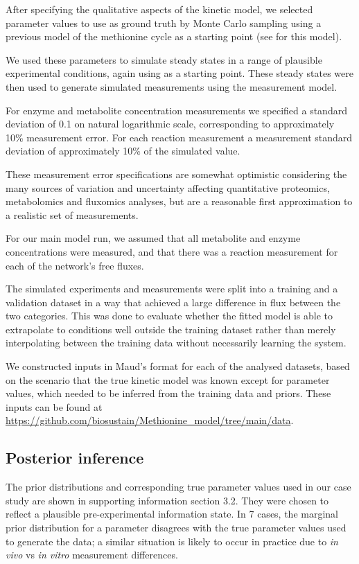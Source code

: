 \documentclass[journal=asbcd6,manuscript=article,layout=traditional]{achemso}
\begin{document}
After specifying the qualitative aspects of the kinetic model, we
selected parameter values to use as ground truth by Monte Carlo sampling
using a previous model of the methionine cycle as a starting point (see
\citet{saa_construction_2016} for this model).

We used these parameters to simulate steady states in a range of
plausible experimental conditions, again using
\citet{saa_construction_2016} as a starting point. These steady states
were then used to generate simulated measurements using the measurement
model.

For enzyme and metabolite concentration measurements we specified a
standard deviation of 0.1 on natural logarithmic scale, corresponding to
approximately 10\% measurement error. For each reaction measurement a
measurement standard deviation of approximately 10\% of the simulated
value.

These measurement error specifications are somewhat optimistic
considering the many sources of variation and uncertainty affecting
quantitative proteomics, metabolomics and fluxomics analyses, but are a
reasonable first approximation to a realistic set of measurements.

For our main model run, we assumed that all metabolite and enzyme
concentrations were measured, and that there was a reaction measurement
for each of the network's free fluxes.

The simulated experiments and measurements were split into a training
and a validation dataset in a way that achieved a large difference in
flux between the two categories. This was done to evaluate whether the
fitted model is able to extrapolate to conditions well outside the
training dataset rather than merely interpolating between the training
data without necessarily learning the system.

We constructed inputs in Maud's format for each of the analysed
datasets, based on the scenario that the true kinetic model was known
except for parameter values, which needed to be inferred from the
training data and priors. These inputs can be found at
\url{https://github.com/biosustain/Methionine_model/tree/main/data}.

\subsection{Posterior inference}\label{posterior-inference}

The prior distributions and corresponding true parameter values used in
our case study are shown in supporting information section 3.2. They
were chosen to reflect a plausible pre-experimental information state.
In 7 cases, the marginal prior distribution for a parameter disagrees
with the true parameter values used to generate the data; a similar
situation is likely to occur in practice due to \emph{in vivo} vs
\emph{in vitro} measurement differences.
\end{document}
